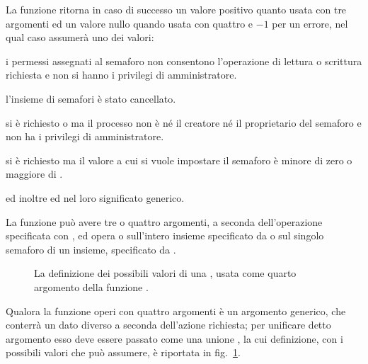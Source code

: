 \begin{funcproto}{
}

{La funzione ritorna in caso di successo un valore positivo quanto usata con
  tre argomenti ed un valore nullo quando usata con quattro e $-1$ per un
  errore, nel qual caso  assumerà uno dei valori:
  \begin{errlist}
  \item[\errcode{EACCES}] i permessi assegnati al semaforo non consentono
    l'operazione di lettura o scrittura richiesta e non si hanno i privilegi
    di amministratore.
    \item[\errcode{EIDRM}] l'insieme di semafori è stato cancellato.
    \item[\errcode{EPERM}] si è richiesto  o 
      ma il processo non è né il creatore né il proprietario del semaforo e
      non ha i privilegi di amministratore.
    \item[\errcode{ERANGE}] si è richiesto   ma il
      valore a cui si vuole impostare il semaforo è minore di zero o maggiore
      di .
   \end{errlist}
   ed inoltre  ed  nel loro significato
   generico.}
\end{funcproto}

La funzione può avere tre o quattro argomenti, a seconda dell'operazione
specificata con , ed opera o sull'intero insieme specificato da
 o sul singolo semaforo di un insieme, specificato da
. 

\begin{figure}[!htb]
  \footnotesize \centering
  \begin{minipage}[c]{0.80\textwidth}
  \end{minipage} 
  \normalsize 
  \caption{La definizione dei possibili valori di una 
    , usata come quarto argomento della funzione
    .}
  \label{fig:ipc_semun}
\end{figure}

Qualora la funzione operi con quattro argomenti  è un argomento
generico, che conterrà un dato diverso a seconda dell'azione richiesta; per
unificare detto argomento esso deve essere passato come una unione
, la cui definizione, con i possibili valori che può assumere, è
riportata in fig.~\ref{fig:ipc_semun}.


